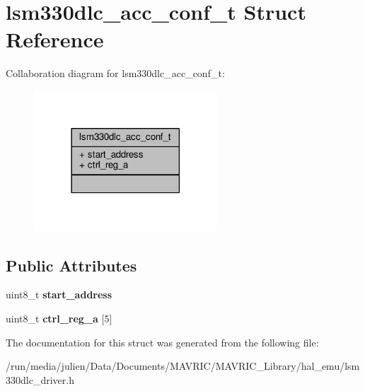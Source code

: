 \hypertarget{structlsm330dlc__acc__conf__t}{\section{lsm330dlc\+\_\+acc\+\_\+conf\+\_\+t Struct Reference}
\label{structlsm330dlc__acc__conf__t}
}


Collaboration diagram for lsm330dlc\+\_\+acc\+\_\+conf\+\_\+t\+:
\nopagebreak
\begin{figure}[H]
\begin{center}
\leavevmode
\includegraphics[width=194pt]{structlsm330dlc__acc__conf__t__coll__graph}
\end{center}
\end{figure}
\subsection*{Public Attributes}
\begin{DoxyCompactItemize}
\item 
\hypertarget{structlsm330dlc__acc__conf__t_a9cc27d3865dfdf1c59f6ee96041d06eb}{uint8\+\_\+t {\bfseries start\+\_\+address}}\label{structlsm330dlc__acc__conf__t_a9cc27d3865dfdf1c59f6ee96041d06eb}

\item 
\hypertarget{structlsm330dlc__acc__conf__t_a46e3efd2000b06f03a33256bd9ed1627}{uint8\+\_\+t {\bfseries ctrl\+\_\+reg\+\_\+a} \mbox{[}5\mbox{]}}\label{structlsm330dlc__acc__conf__t_a46e3efd2000b06f03a33256bd9ed1627}

\end{DoxyCompactItemize}


The documentation for this struct was generated from the following file\+:\begin{DoxyCompactItemize}
\item 
/run/media/julien/\+Data/\+Documents/\+M\+A\+V\+R\+I\+C/\+M\+A\+V\+R\+I\+C\+\_\+\+Library/hal\+\_\+emu/lsm330dlc\+\_\+driver.\+h\end{DoxyCompactItemize}

